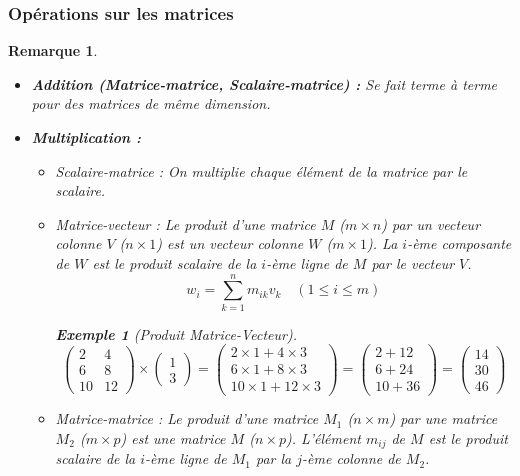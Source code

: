\documentclass{article}
\newtheorem{remark}{Remarque}
\newtheorem{example}{Exemple}
\begin{document}
\subsubsection{Opérations sur les matrices}
\begin{remark}
\begin{itemize}
    \item \textbf{Addition (Matrice-matrice, Scalaire-matrice) :} Se fait terme à terme pour des matrices de même dimension.
    \item \textbf{Multiplication :}
    \begin{itemize}
        \item \textit{Scalaire-matrice :} On multiplie chaque élément de la matrice par le scalaire.
        \item \textit{Matrice-vecteur :} Le produit d'une matrice $M$ ($m \times n$) par un vecteur colonne $V$ ($n \times 1$) est un vecteur colonne $W$ ($m \times 1$). La $i$-ème composante de $W$ est le produit scalaire de la $i$-ème ligne de $M$ par le vecteur $V$.
        \[ w_i = \sum_{k=1}^{n} m_{ik} v_k \quad (1 \le i \le m) \]
        \begin{example}[Produit Matrice-Vecteur]
        \[ \begin{pmatrix} 2 & 4 \\ 6 & 8 \\ 10 & 12 \end{pmatrix} \times \begin{pmatrix} 1 \\ 3 \end{pmatrix} = \begin{pmatrix} 2 \times 1 + 4 \times 3 \\ 6 \times 1 + 8 \times 3 \\ 10 \times 1 + 12 \times 3 \end{pmatrix} = \begin{pmatrix} 2 + 12 \\ 6 + 24 \\ 10 + 36 \end{pmatrix} = \begin{pmatrix} 14 \\ 30 \\ 46 \end{pmatrix} \]
        \end{example}
        \item \textit{Matrice-matrice :} Le produit d'une matrice $M_1$ ($n \times m$) par une matrice $M_2$ ($m \times p$) est une matrice $M$ ($n \times p$). L'élément $m_{ij}$ de $M$ est le produit scalaire de la $i$-ème ligne de $M_1$ par la $j$-ème colonne de $M_2$.

\end{itemize}
\end{itemize}
\end{remark}
\end{document}
